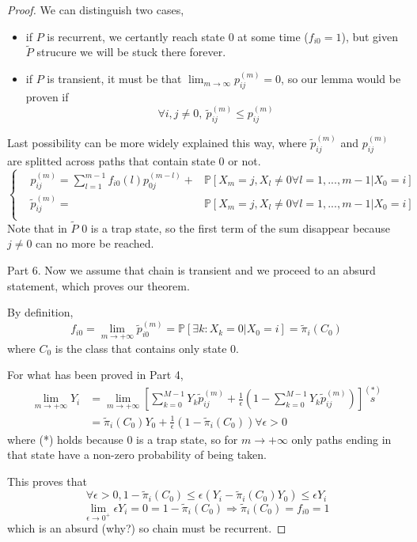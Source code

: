 \begin{proof}
		We can distinguish two cases,
		\begin{itemize}
			\item if $P$ is recurrent, we certantly reach state 0 at some time ($f_{i0} = 1$), but given $\tilde{P}$ strucure we will be stuck there forever.
			\item if $P$ is transient, it must be that $\lim_{m \to \infty} p_{ij}^{(m)} = 0 $, so our lemma would be proven if
			$$ \forall i, j \neq 0, ~ \tilde{p}_{ij}^{(m)} \le p_{ij}^{(m)} $$
		\end{itemize}

		Last possibility can be more widely explained this way, where $\tilde{p}_{ij}^{(m)}$ and $p_{ij}^{(m)}$ are splitted across paths that contain state 0 or not.
		\begin{equation}
			\left\{ \begin{split}
				& p_{ij}^{(m)} = \sum_{l=1}^{m-1} f_{i0}(l) p_{0j}^{(m-l)} +
					& \mathbb{P}[X_m = j, X_l \neq 0 \forall l = 1, ..., m-1 | X_0 = i] \\
				& \tilde{p}_{ij}^{(m)} =
					& \mathbb{P}[X_m = j, X_l \neq 0 \forall l = 1, ..., m-1 | X_0 = i] \\
			\end{split} \right.
		\end{equation}
		Note that in $\tilde{P}$ 0 is a trap state, so the first term of the sum disappear because $j \neq 0$ can no more be reached.

		Part 6.
		Now we assume that chain is transient and we proceed to an absurd statement, which proves our theorem.

		By definition,
		$$ f_{i0} = \lim_{m \to +\infty} \tilde{p}_{i0}^{(m)} = \mathbb{P}[\exists k : X_k = 0 | X_0 = i] = \tilde{\pi}_i(C_0)$$
		where $C_0$ is the class that contains only state 0.

		For what has been proved in Part 4,
		\begin{equation}
			\begin{split}
				\lim_{m \to +\infty} Y_i & =
					\lim_{m \to +\infty} \left[ \sum_{k=0}^{M-1} Y_k \tilde{p}_{ij}^{(m)}
						+ \frac{1}{\epsilon} \left( 1 - \sum_{k=0}^{M-1} Y_k \tilde{p}_{ij}^{(m)} \right) \right] \stackrel{(*)}{s} \\
				& = \tilde{\pi}_i(C_0) Y_0 + \frac{1}{\epsilon} \left( 1 - \tilde{\pi}_i(C_0) \right) \forall \epsilon > 0
			\end{split}
		\end{equation}
		where (*) holds because 0 is a trap state, so for $m \to +\infty$ only paths ending in that state have a non-zero probability of being taken.

		This proves that
		$$ \forall \epsilon>0, 1 - \tilde{\pi}_i(C_0) \le \epsilon \left( Y_i - \tilde{\pi}_i(C_0) Y_0 \right) \le \epsilon Y_i$$
		$$ \lim_{\epsilon \to 0^{+}} \epsilon Y_i = 0 = 1 - \tilde{\pi}_i(C_0) \Rightarrow \tilde{\pi}_i(C_0) = f_{i0} = 1$$
		which is an absurd (why?) so chain must be recurrent.
	\end{proof}
